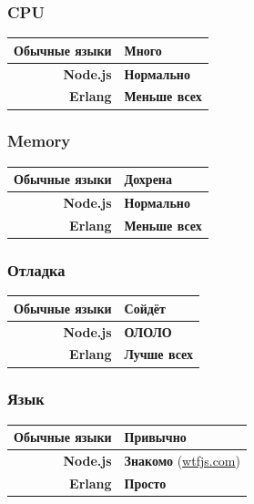 \documentclass[14pt]{beamer}
\begin{document}
\begin{frame}
  \frametitle{CPU}
  \begin{center}
    \begin{tabular}{| r | l |}
      \hline
      \textbf{\color{darkgray}Обычные языки} & \textbf{\color{red}Много} \\ \hline
      \textbf{\color{darkgray}Node.js} & \textbf{\color{darkgreen}Нормально} \\ \hline
      \textbf{\color{darkgray}Erlang} & \textbf{\color{darkgreen}Меньше всех} \\
      \hline
    \end{tabular}
  \end{center}
\end{frame}

\begin{frame}
  \frametitle{Memory}
  \begin{center}
    \begin{tabular}{| r | l |}
      \hline
      \textbf{\color{darkgray}Обычные языки} & \textbf{\color{red}Дохрена} \\ \hline
      \textbf{\color{darkgray}Node.js} & \textbf{\color{darkgreen}Нормально} \\ \hline
      \textbf{\color{darkgray}Erlang} & \textbf{\color{darkgreen}Меньше всех} \\
      \hline
    \end{tabular}
  \end{center}
\end{frame}

\begin{frame}
  \frametitle{Отладка}
  \begin{center}
    \begin{tabular}{| r | l |}
      \hline
      \textbf{\color{darkgray}Обычные языки} & \textbf{\color{blue}Сойдёт} \\ \hline
      \textbf{\color{darkgray}Node.js} & \textbf{\color{red}ОЛОЛО} \\ \hline
      \textbf{\color{darkgray}Erlang} & \textbf{\color{darkgreen}Лучше всех} \\
      \hline
    \end{tabular}
  \end{center}
\end{frame}

\begin{frame}
  \frametitle{Язык}
  \begin{center}
    \begin{tabular}{| r | l |}
      \hline
      \textbf{\color{darkgray}Обычные языки} & \textbf{\color{blue}Привычно} \\ \hline
      \textbf{\color{darkgray}Node.js} & \textbf{\color{red}Знакомо} ({\color{blue}\url{wtfjs.com}}) \\ \hline
      \textbf{\color{darkgray}Erlang} & \textbf{\color{darkgreen}Просто} \\
      \hline
    \end{tabular}
  \end{center}
\end{frame}
\end{document}

